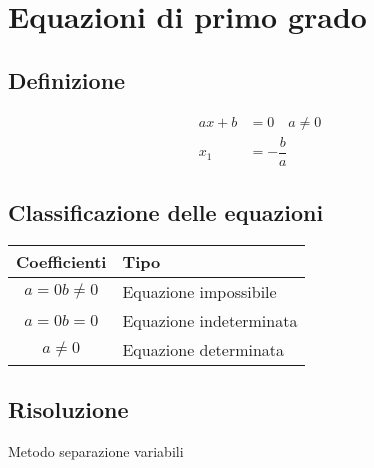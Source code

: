 \chapter{Equazioni di primo grado}
\section{Definizione}
\begin{align*}
ax+b&={}0\quad a\neq 0\\
x_1&=-\dfrac{b}{a}
\end{align*}
\section{Classificazione delle equazioni}
{\centering{}
	\begin{tabular}{cl}
		\toprule
		Coefficienti&Tipo\\
		\midrule
		$a=0$\quad $b\neq 0$	& Equazione impossibile  \\ 
		$a=0$\quad $b=0$	& Equazione indeterminata\\ 
		$a\neq0$	& Equazione determinata  \\ 
		\bottomrule
	\end{tabular}\par}
\section{Risoluzione}
Metodo separazione variabili
